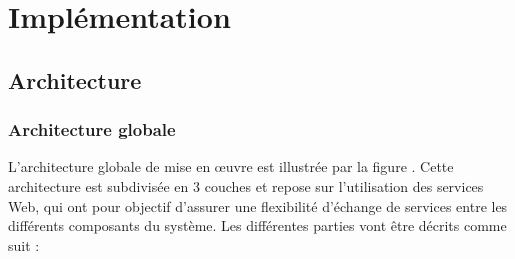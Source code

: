 \chapter{Implémentation}

\section{Architecture} %
\label{sec:architecture}
\subsection{Architecture globale} %
\label{ssub:architecture_globale}
L’architecture globale de mise en œuvre est illustrée par la figure . Cette architecture est subdivisée en 3 couches et repose sur l’utilisation des services Web, qui ont pour objectif d’assurer une flexibilité d’échange de services entre les différents composants du système.\newline
Les différentes parties vont être décrits comme suit :
